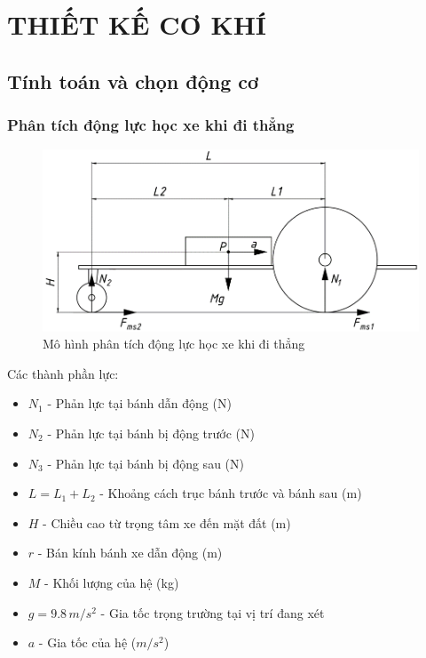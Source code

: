 \chapter{THIẾT KẾ CƠ KHÍ}
    \section{Tính toán và chọn động cơ}
        \subsection{Phân tích động lực học xe khi đi thẳng}
            \begin{figure}[H]
                \centering
                \includegraphics[width=1\textwidth]{pictures/chapter3/c3_p1_StraightAnalysis.png}
                \caption{Mô hình phân tích động lực học xe khi đi thẳng}
                \label{fig:3.1}
            \end{figure}
            \hspace*{0.6cm}Các thành phần lực:
            \begin{itemize}
                \item $N_1$ - Phản lực tại bánh dẫn động (N)
                \item $N_2$ - Phản lực tại bánh bị động trước (N)
                \item $N_3$ - Phản lực tại bánh bị động sau (N)
                \item $L = L_1 + L_2$ - Khoảng cách trục bánh trước và bánh sau (m)
                \item $H$ - Chiều cao từ trọng tâm xe đến mặt đất (m)
                \item $r$ - Bán kính bánh xe dẫn động (m)
                \item $M$ - Khối lượng của hệ (kg)
                \item $g = 9.8 \, m/s^2$ - Gia tốc trọng trường tại vị trí đang xét
                \item $a$ - Gia tốc của hệ ($m/s^2$)
            \end{itemize}
